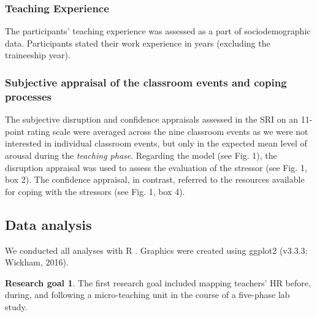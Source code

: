 \documentclass[]{elsarticle} %
\begin{document}
\hypertarget{teaching-experience}{%
\subsubsection{Teaching Experience}\label{teaching-experience}}

The participants' teaching experience was assessed as a part of
sociodemographic data. Participants stated their work experience in
years (excluding the traineeship year).

\hypertarget{subjective-appraisal-of-the-classroom-events-and-coping-processes}{%
\subsubsection{Subjective appraisal of the classroom events and coping
processes}\label{subjective-appraisal-of-the-classroom-events-and-coping-processes}}

The subjective disruption and confidence appraisals assessed in the SRI
on an 11-point rating scale were averaged across the nine classroom
events as we were not interested in individual classroom events, but
only in the expected mean level of arousal during the \emph{teaching
phase}. Regarding the model (see Fig. 1), the disruption appraisal was
used to assess the evaluation of the stressor (see Fig. 1, box 2). The
confidence appraisal, in contrast, referred to the resources available
for coping with the stressors (see Fig. 1, box 4).

\hypertarget{data-analysis}{%
\subsection{Data analysis}\label{data-analysis}}

We conducted all analyses with R \citep{RStudio2020}. Graphics were
created using ggplot2 (v3.3.3; Wickham, 2016).

\textbf{Research goal 1}. The first research goal included mapping
teachers' HR before, during, and following a micro-teaching unit in the
course of a five-phase lab study.
\end{document}
